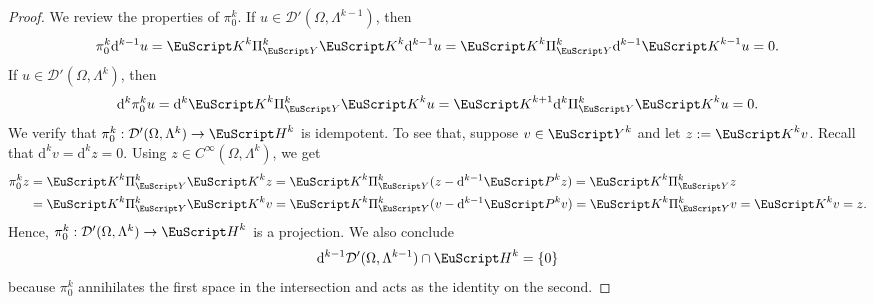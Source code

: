 \documentclass[10pt,a4paper]{amsart}
\theoremstyle{definition}
\theoremstyle{remark}
\numberwithin{equation}{section}
\newcommand{\calD}{{\mathcal D}}
\newcommand{\euH}{{\EuScript H}}
\newcommand{\euK}{{\EuScript K}}
\newcommand{\euP}{{\EuScript P}}
\newcommand{\cartan}{{\mathrm d}}
\newcommand{\Domain}{{\Omega}}
\newcommand{\Alt}[1]{\Lambda^{#1}}
\newcommand{\Proj}{\pi}
\newcommand{\Projection}{\Pi}
\newcommand{\Poincare}{\euP}
\newcommand{\Defect}{\euK}
\newcommand{\Harmonic}{{\euH}}
\begin{document}
\begin{proof}
    We review the properties of $\Proj^{k}_{0}$.
    If $u \in \calD'(\Domain,\Alt{k-1})$, then 
    \begin{align*}
        \Proj^{k}_{0} \cartan^{k-1} u = \Defect^{k} \Projection_{\Hilbertcomplement}^{k} \Defect^{k} \cartan^{k-1} u = \Defect^{k} \Projection_{\Hilbertcomplement}^{k} \cartan^{k-1} \Defect^{k-1} u = 0
        .
    \end{align*}
    If $u \in \calD'(\Domain,\Alt{k})$, then 
    \begin{align*}
        \cartan^{k} \Proj^{k}_{0} u = \cartan^{k} \Defect^{k} \Projection_{\Hilbertcomplement}^{k} \Defect^{k} u = \Defect^{k+1} \cartan^{k} \Projection_{\Hilbertcomplement}^{k} \Defect^{k} u = 0
        .
    \end{align*}
    We verify that $\Proj^{k}_{0} : \calD'(\Domain,\Alt{k}) \to \Harmonic^{k}$ is idempotent. 
    To see that, suppose $v \in \Hilbertcomplement^{k}$ and let $z := \Defect^{k} v$. 
    Recall that $\cartan^{k} v = \cartan^{k} z = 0$.
    Using $z \in C^{\infty}(\Domain,\Alt{k})$, we get 
    \begin{align*}
        \Proj^{k}_{0} z
        &
        =
        \Defect^{k} \Projection_{\Hilbertcomplement}^{k} \Defect^{k} z
        =
        \Defect^{k} \Projection_{\Hilbertcomplement}^{k} ( z - \cartan^{k-1} \Poincare^{k} z )
        =
        \Defect^{k} \Projection_{\Hilbertcomplement}^{k} z 
        \\&
        =
        \Defect^{k} \Projection_{\Hilbertcomplement}^{k} \Defect^{k} v 
        =
        \Defect^{k} \Projection_{\Hilbertcomplement}^{k} ( v - \cartan^{k-1} \Poincare^{k} v )
        =
        \Defect^{k} \Projection_{\Hilbertcomplement}^{k} v 
        =
        \Defect^{k} v 
        =
        z
        .
    \end{align*}
    Hence, $\Proj^{k}_{0} : \calD'(\Domain,\Alt{k}) \to \Harmonic^{k}$ is a projection. 
    We also conclude 
    \begin{align}\label{math:smooth-forms:disjointness}
        \cartan^{k-1} \calD'(\Domain,\Alt{k-1}) \cap \Harmonic^{k} = \{0\}
    \end{align}
    because $\Proj^{k}_{0}$ annihilates the first space in the intersection and acts as the identity on the second.
    

\end{proof}
\end{document}
